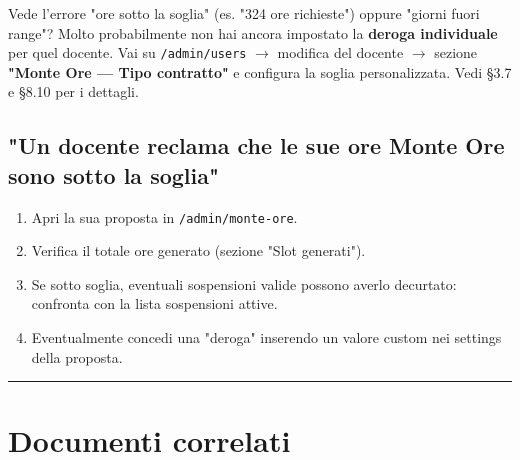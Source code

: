 \documentclass[11pt,a4paper]{article}
\begin{document}
Vede l'errore "ore sotto la soglia" (es. "324 ore richieste") oppure "giorni fuori range"? Molto probabilmente non hai ancora impostato la \textbf{deroga individuale} per quel docente. Vai su \texttt{/admin/users} $\rightarrow$ modifica del docente $\rightarrow$ sezione \textbf{"Monte Ore --- Tipo contratto"} e configura la soglia personalizzata. Vedi §3.7 e §8.10 per i dettagli.

\subsection{"Un docente reclama che le sue ore Monte Ore sono sotto la soglia"}


\begin{enumerate}
  \item Apri la sua proposta in \texttt{/admin/monte-ore}.
  \item Verifica il totale ore generato (sezione "Slot generati").
  \item Se sotto soglia, eventuali sospensioni valide possono averlo decurtato: confronta con la lista sospensioni attive.
  \item Eventualmente concedi una "deroga" inserendo un valore custom nei settings della proposta.
\end{enumerate}

\medskip\hrule\medskip

\section{Documenti correlati}
\end{document}
